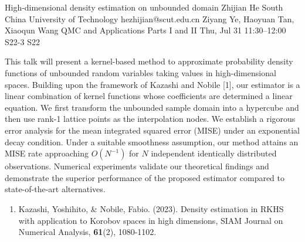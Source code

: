 \documentclass[12pt,lettersize,oneside]{book} %
\begin{document}
\begin{talk}
  {High-dimensional density estimation on  unbounded domain}%
  {Zhijian He}%
  {South China University of Technology}%
  {hezhijian@scut.edu.cn}%
  {Ziyang Ye, Haoyuan Tan, Xiaoqun Wang}%
  {QMC and Applications Parts I and II}%
  {Thu, Jul 31 11:30--12:00}%
  {S22-3}%
  {S22}%
    
   
This talk will present a kernel-based method to approximate probability density functions of unbounded random variables taking values in high-dimensional spaces. Building upon the framework of Kazashi and Nobile [1], our estimator is a linear combination of kernel functions whose coefficients are determined a linear equation. We first transform the unbounded sample domain into a hypercube and then use rank-1 lattice points as the interpolation nodes.
We establish a rigorous error analysis for the mean integrated squared error (MISE) under an exponential decay condition.  Under a suitable smoothness assumption, our method attains an MISE rate  approaching $O(N^{-1})$ for $N$ independent identically distributed observations. Numerical experiments validate our theoretical findings and demonstrate the superior performance of the proposed estimator compared to state-of-the-art alternatives.
\medskip


\begin{enumerate}
 \item[{[1]}] Kazashi, Yoshihito, \& Nobile, Fabio. (2023). Density estimation in {RKHS} with application to Korobov spaces in high dimensions, SIAM Journal on Numerical Analysis, \textbf{61}(2), 1080-1102.
\end{enumerate}

\end{talk}
\end{document}
